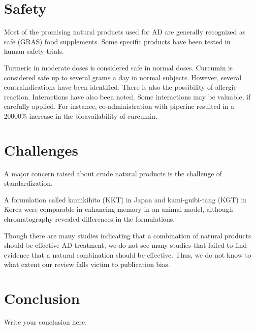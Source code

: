 \documentclass[twocolumn]{article}
\begin{document}
\section{Safety}

Most of the promising natural products used for AD
are generally recognized as safe (GRAS) food supplements.
Some specific products have been tested in human safety trials.



Turmeric in moderate doses is considered safe in normal doses.
Curcumin is considered safe up to several grams a day in normal subjects.
However, several contraindications have been identified.
There is also the possibility of allergic reaction.
Interactions have also been noted.
Some interactions may be valuable, if carefully applied.
For instance, co-administration with piperine resulted in a
20000\% increase in the bioavailability of curcumin.
\cite{mishra2008effect}








\section{Challenges}


A major concern raised about crude natural products is
the challenge of standardization.


A formulation called kamikihito (KKT) in Japan
and kami-guibi-tang (KGT) in Korea
were comparable in enhancing memory in an animal model,
although chromatography revealed differences in the formulations.
\cite{watari2015comparing}


Though there are many studies indicating that
a combination of natural products should be effective
AD treatment, we do not see many studies that
failed to find evidence that a natural combination
should be effective.
Thus, we do not know to what extent our review falls victim
to publication bias.







\section{Conclusion}
Write your conclusion here.












\end{document}
